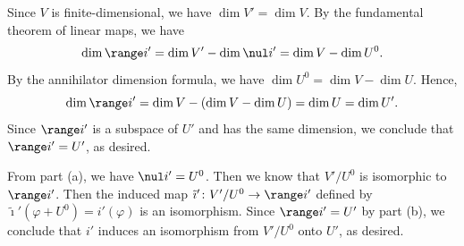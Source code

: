 \begin{exc}
\begin{solution}
\begin{parts}
  Since $V$ is finite-dimensional, we have $\dim V'=\dim V$. By the fundamental
  theorem of linear maps, we have
  \[ \dim\range i' = \dim V'-\dim\nul i' = \dim V-\dim U^0. \]
  By the annihilator dimension formula, we have $\dim U^0=\dim V-\dim U$.
  Hence,
  \[ \dim\range i' = \dim V-(\dim V-\dim U) = \dim U = \dim U'. \]
  Since $\range i'$ is a subspace of $U'$ and has the same dimension, we
  conclude that $\range i'=U'$, as desired.
\item From part (a), we have $\nul i'=U^0$. Then we know that $V'/U^0$ is
  isomorphic to $\range i'$. Then the induced map
  $\tilde{\imath}'\colon V'/U^0\to\range i'$ defined by
  $\tilde{\imath}'(\varphi+U^0)=i'(\varphi)$ is an isomorphism. Since
  $\range i'=U'$ by part (b), we conclude that $i'$ induces an isomorphism from
  $V'/U^0$ onto $U'$, as desired.
\end{parts}
\end{solution}


\end{exc}
